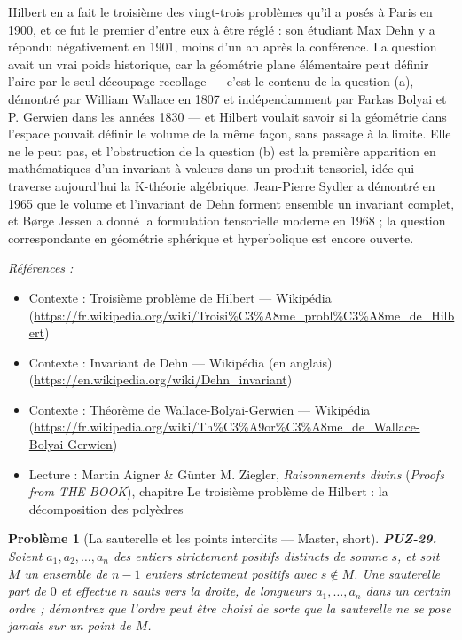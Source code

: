 \documentclass[11pt]{article}
\newtheorem{problem}{Problème}
\newenvironment{refs}{\par\small\noindent\emph{Références :}\begin{itemize}\setlength\itemsep{0pt}}{\end{itemize}\normalsize}
\begin{document}
\noindent Hilbert en a fait le troisième des vingt-trois problèmes qu'il a posés à Paris en 1900, et ce fut le premier d'entre eux à être réglé : son étudiant Max Dehn y a répondu négativement en 1901, moins d'un an après la conférence. La question avait un vrai poids historique, car la géométrie plane élémentaire peut définir l'aire par le seul découpage-recollage --- c'est le contenu de la question (a), démontré par William Wallace en 1807 et indépendamment par Farkas Bolyai et P. Gerwien dans les années 1830 --- et Hilbert voulait savoir si la géométrie dans l'espace pouvait définir le volume de la même façon, sans passage à la limite. Elle ne le peut pas, et l'obstruction de la question (b) est la première apparition en mathématiques d'un invariant à valeurs dans un produit tensoriel, idée qui traverse aujourd'hui la K-théorie algébrique. Jean-Pierre Sydler a démontré en 1965 que le volume et l'invariant de Dehn forment ensemble un invariant complet, et Børge Jessen a donné la formulation tensorielle moderne en 1968 ; la question correspondante en géométrie sphérique et hyperbolique est encore ouverte.

\begin{refs}
\item Contexte : Troisième problème de Hilbert --- Wikipédia (\url{https://fr.wikipedia.org/wiki/Troisi%C3%A8me_probl%C3%A8me_de_Hilbert})
\item Contexte : Invariant de Dehn --- Wikipédia (en anglais) (\url{https://en.wikipedia.org/wiki/Dehn_invariant})
\item Contexte : Théorème de Wallace-Bolyai-Gerwien --- Wikipédia (\url{https://fr.wikipedia.org/wiki/Th%C3%A9or%C3%A8me_de_Wallace-Bolyai-Gerwien})
\item Lecture : Martin Aigner \& Günter M. Ziegler, \textit{Raisonnements divins} (\textit{Proofs from THE BOOK}), chapitre \og{} Le troisième problème de Hilbert : la décomposition des polyèdres \fg{}
\end{refs}

\bigskip

\begin{problem}[{La sauterelle et les points interdits --- Master, short}]
\textbf{PUZ-29.} Soient $ a_1, a_2, \ldots, a_n $ des entiers strictement positifs distincts de somme $ s $, et soit $ M $ un ensemble de $ n - 1 $ entiers strictement positifs avec $ s \notin M $. Une sauterelle part de $ 0 $ et effectue $ n $ sauts vers la droite, de longueurs $ a_1, \ldots, a_n $ dans un certain ordre ; démontrez que l'ordre peut être choisi de sorte que la sauterelle ne se pose jamais sur un point de $ M $.
\end{problem}
\end{document}
